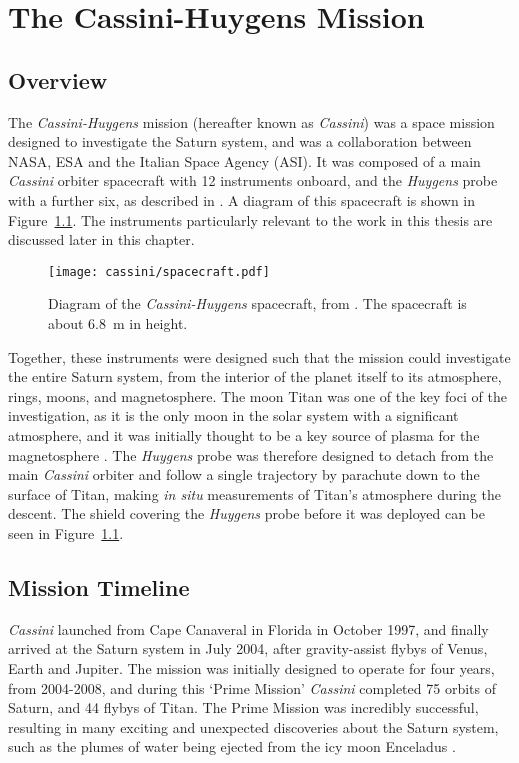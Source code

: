 \chapter{The Cassini-Huygens Mission}
\label{chap:cassini}
\section{Overview}
The \textit{Cassini-Huygens} mission (hereafter known as \textit{Cassini}) was a space mission designed to investigate the Saturn system, and was a collaboration between NASA, ESA and the Italian Space Agency (ASI). It was composed of a main \textit{Cassini} orbiter spacecraft with 12 instruments onboard, and the \textit{Huygens} probe with a further six, as described in \citet{matson2002}. A diagram of this spacecraft is shown in Figure~\ref{cassini:fig:spacecraft}. The instruments particularly relevant to the work in this thesis are discussed later in this chapter. 

\begin{figure}
\centering
\noindent\texttt{[image: cassini/spacecraft.pdf]}
\caption[Diagram of the \textit{Cassini-Huygens} spacecraft]{Diagram of the \textit{Cassini-Huygens} spacecraft, from \citet{narvaez2004}. The spacecraft is about \SI{6.8}{m} in height.}
\label{cassini:fig:spacecraft}
\end{figure}

Together, these instruments were designed such that the mission could investigate the entire Saturn system, from the interior of the planet itself to its atmosphere, rings, moons, and magnetosphere. The moon Titan was one of the key foci of the investigation, as it is the only moon in the solar system with a significant atmosphere, and it was initially thought to be a key source of plasma for the magnetosphere \citep{smith2004}. The \textit{Huygens} probe was therefore designed to detach from the main \textit{Cassini} orbiter and follow a single trajectory by parachute down to the surface of Titan, making \textit{in situ} measurements of Titan's atmosphere during the descent. The shield covering the \textit{Huygens} probe before it was deployed can be seen in Figure~\ref{cassini:fig:spacecraft}.

\section{Mission Timeline}\label{cassini:sec:timeline}
\textit{Cassini} launched from Cape Canaveral in Florida in October 1997, and finally arrived at the Saturn system in July 2004, after gravity-assist flybys of Venus, Earth and Jupiter. The mission was initially designed to operate for four years, from 2004-2008, and during this `Prime Mission' \textit{Cassini} completed 75 orbits of Saturn, and 44 flybys of Titan. The Prime Mission was incredibly successful, resulting in many exciting and unexpected discoveries about the Saturn system, such as the plumes of water being ejected from the icy moon Enceladus \citep{dougherty2006}. 

